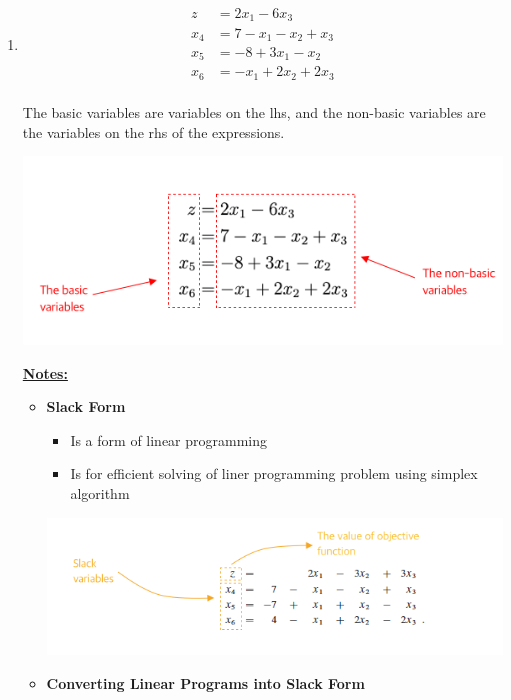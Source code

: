 \documentclass[12pt]{article}
\begin{document}
\begin{enumerate}[1.]
    \item

    \begin{align*}
        z &= 2x_1 - 6x_3\\
        x_4 &= 7 - x_1 - x_2 + x_3\\
        x_5 &= -8 + 3x_1 - x_2\\
        x_6 &= -x_1 + 2x_2 + 2x_3\\
    \end{align*}

    \bigskip

    The basic variables are variables on the lhs, and the non-basic variables are the
    variables on the rhs of the expressions.

    \begin{center}
    \includegraphics[width=0.7\linewidth]{images/worksheet_6_solution_12.png}
    \end{center}

    \bigskip

    \underline{\textbf{Notes:}}

    \bigskip

    \begin{itemize}

        \item \textbf{Slack Form}

        \begin{itemize}
            \item Is a form of linear programming
            \item Is for efficient solving of liner programming problem using simplex algorithm
        \end{itemize}

        \begin{center}
        \includegraphics[width=\linewidth]{images/worksheet_6_solution_6.png}
        \end{center}
        \item \textbf{Converting Linear Programs into Slack Form}


\end{itemize}
\end{enumerate}
\end{document}
